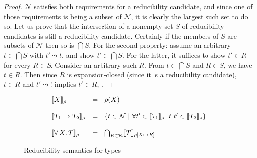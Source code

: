 \documentclass{article}
\begin{document}
\begin{proof}
  $\mathcal{N}$ satisfies both requirements for a reducibility
  candidate, and since one of those requirements is being a subset of
  $\mathcal{N}$, it is clearly the largest such set to do so.  Let us
  prove that the intersection of a nonempty set $S$ of reducibility
  candidates is still a reducibility candidate.  Certainly if the
  members of $S$ are subsets of $\mathcal{N}$ then so is $\bigcap S$.
  For the second property: assume an arbitrary $t\in\bigcap S$ with
  $t'\leadsto t$, and show $t'\in\bigcap S$.  For the latter, it
  suffices to show $t'\in R$ for every $R\in S$.  Consider an
  arbitrary such $R$.  From $t\in\bigcap S$ and $R \in S$, we have
  $t\in R$.  Then since $R$ is expansion-closed (since it is a reducibility
  candidate), $t \in R$ and
  $t'\leadsto t$ implies $t'\in R$, .
\end{proof}

\begin{figure}
\[
\begin{array}{lll}
\llbracket X \rrbracket_\rho & = & \rho(X) \\ \\
\llbracket T_1 \to T_2 \rrbracket_\rho & = & \{ t \in \mathcal{N}\ |\ \forall t'\in\llbracket T_1 \rrbracket_\rho.\ t\ t'\in\llbracket T_2 \rrbracket_\rho \} \\ \\
\llbracket \forall\, X.\,T \rrbracket_\rho & = & \bigcap_{R\in\mathcal{R}} \llbracket T \rrbracket_{\rho[X\mapsto R]} 
\end{array}
\]
\caption{Reducibility semantics for types}
\label{fig:semtp}
\end{figure}
\end{document}
